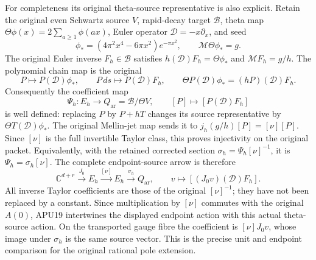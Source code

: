 For completeness its original theta-source representative is
also explicit.  Retain the original even Schwartz source \(V\),
rapid-decay target \(\mathscr B\), theta map
\(\Theta\phi(x)=2\sum_{a\ge1}\phi(ax)\), Euler operator
\(\mathcal D=-x\partial_x\), and seed
\[
 \phi_*=(4\pi^2x^4-6\pi x^2)e^{-\pi x^2},\qquad
 \mathcal M\Theta\phi_*=g.
\]
The original Euler inverse \(F_h\in\mathscr B\) satisfies
\(h(\mathcal D)F_h=\Theta\phi_*\) and
\(\mathcal MF_h=g/h\).
The polynomial chain map is the original
\[
 P\longmapsto P(\mathcal D)\phi_*,
 \qquad P\,ds\longmapsto P(\mathcal D)F_h,\qquad
 \Theta P(\mathcal D)\phi_*
       =(hP)(\mathcal D)F_h.
 \tag{APU20}
\]
Consequently the coefficient map
\[
 \Psi_h:E_h\longrightarrow
 Q_{\mathrm{ar}}=\mathscr B/\Theta V,\qquad
 [P]\longmapsto[P(\mathcal D)F_h]
 \tag{APU21}
\]
is well defined: replacing \(P\) by \(P+hT\) changes its source
representative by \(\Theta T(\mathcal D)\phi_*\).
The original Mellin-jet map sends it to
\(j_h(g/h)[P]=[\nu][P]\).
Since \([\nu]\) is the full invertible Taylor class, this proves
injectivity on the original packet.  Equivalently, with the
retained corrected section
\(\sigma_h=\Psi_h[\nu]^{-1}\), it is
\(\Psi_h=\sigma_h[\nu]\).
The complete endpoint-source arrow is therefore
\[
 \mathbb C^{d+r}\xrightarrow{J_0}E_h
       \xrightarrow{[\nu]}E_h
       \xrightarrow{\sigma_h}Q_{\mathrm{ar}},
 \qquad
 v\longmapsto[(J_0v)(\mathcal D)F_h].
 \tag{APU22}
\]
All inverse Taylor coefficients are those of the original
\([\nu]^{-1}\); they have not been replaced by a constant.
Since multiplication by \([\nu]\) commutes with the original
\(A(0)\), APU19 intertwines the displayed endpoint action with
this actual theta-source action.  On the transported gauge fibre
the coefficient is \([\nu]J_0v\), whose image under \(\sigma_h\)
is the same source vector.  This is the precise unit and endpoint
comparison for the original rational pole extension.


